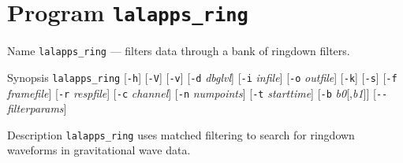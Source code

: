 \section{Program \texttt{lalapps\_ring}}
\label{program:lalapps-ring}

\begin{entry}

\item[Name]
\verb$lalapps_ring$ --- filters data through a bank of ringdown filters.

\item[Synopsis]
\verb$lalapps_ring$ [\verb$-h$] [\verb$-V$] [\verb$-v$]
  [\verb$-d$ \textit{dbglvl}] [\verb$-i$ \textit{infile}]
  [\verb$-o$ \textit{outfile}] [\verb$-k$] [\verb$-s$]
  [\verb$-f$ \textit{framefile}] [\verb$-r$ \textit{respfile}]
  [\verb$-c$ \textit{channel}] [\verb$-n$ \textit{numpoints}]
  [\verb$-t$ \textit{starttime}] [\verb$-b$ \textit{b0}[,\textit{b1}]]
  [\verb$--$ \textit{filterparams}]

\item[Description]
\verb$lalapps_ring$ uses matched filtering to search for ringdown waveforms in
gravitational wave data.


\end{entry}
